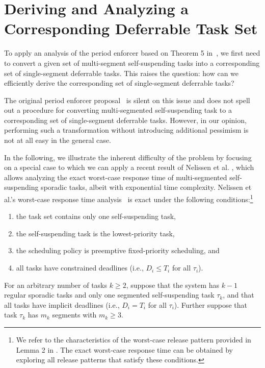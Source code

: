 
\section{Deriving and Analyzing a Corresponding Deferrable Task Set}
\label{sec:convert}

To apply an analysis of the period enforcer based on Theorem 5 in~\cite{Raj:suspension1991}, we first need to convert a given set of multi-segment self-suspending tasks into a corresponding set of single-segment deferrable tasks. This raises the question: how can we efficiently derive the corresponding set of single-segment deferrable tasks? 

The original period enforcer proposal~\cite{Raj:suspension1991} is silent on this issue and does not spell out a procedure for converting  multi-segmented self-suspending task to a corresponding set of single-segment deferrable tasks. However, in our opinion, performing such a transformation without introducing additional pessimism is not at all easy in the general case.

In the following, we illustrate the inherent difficulty of the problem by focusing on a special case to which we can apply a recent result of Nelissen et al. \cite{ecrts15nelissen}, which allows analyzing the exact worst-case response time of multi-segmented self-suspending sporadic tasks, albeit with exponential time complexity. 
Nelissen et al.'s worst-case response time analysis~\cite{ecrts15nelissen} is exact under the following conditions:\footnote{We refer to the characteristics of the worst-case release pattern provided in Lemma 2 in \cite{ecrts15nelissen}. The exact worst-case response time can be obtained by exploring all  release patterns that satisfy these conditions.} 
\begin{enumerate}
	\item the task set contains only one self-suspending task, 
	\item the self-suspending task is the lowest-priority task, 
	\item the scheduling policy is preemptive fixed-priority scheduling, and 
	\item all tasks have constrained deadlines (i.e., $D_i \leq T_i$ for all $\tau_i$).
\end{enumerate}

For an arbitrary number of tasks $k \geq 2$, 
suppose that the system has $k-1$ regular sporadic tasks and only one segmented self-suspending task $\tau_k$, and that all tasks have implicit deadlines (i.e., $D_i = T_i$ for all $\tau_i$). Further suppose that task $\tau_k$ has $m_k$ segments with $m_k \geq 3$.  


